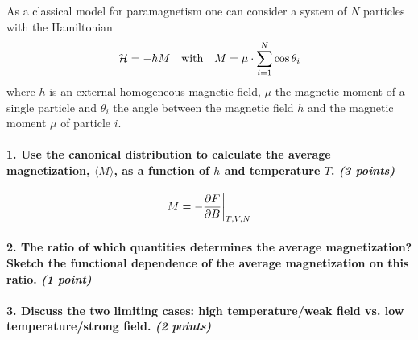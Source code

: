 As a classical model for paramagnetism one 
can consider a system of $N$ particles with 
the Hamiltonian
\begin{equation}
    \mathcal{H}=-hM
    \ \ \ \textnormal{with}\ \ \ 
    M=\mu\cdot\sum_{i=1}^N\cos\theta_i
\end{equation}
where $h$ is an external homogeneous magnetic 
field, $\mu$ the magnetic moment of a single 
particle and $\theta_i$ the angle between the
magnetic field $h$ and the magnetic moment
$\mu$ of particle $i$.

\paragraph{1. Use the canonical distribution 
    to calculate the average magnetization, 
    $\langle M\rangle$, as a function of $h$
    and temperature $T$. 
    \textit{(3 points)}
}
    \begin{align}
        M=
        -\frac{\partial F}{\partial B}\bigg|_{T,V,N}
    \end{align}

\paragraph{2. The ratio of which quantities 
    determines the average magnetization? 
    Sketch the functional dependence of the 
    average magnetization on this ratio. 
    \textit{(1 point)}
}

\paragraph{3. Discuss the two limiting cases: 
    high temperature/weak field vs. 
    low temperature/strong field.
    \textit{(2 points)}
}
